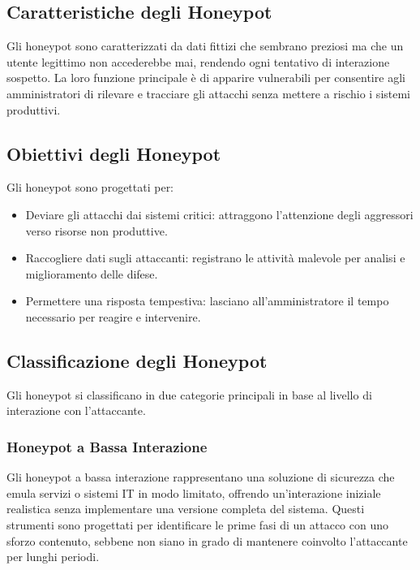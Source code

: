 \subsection{Caratteristiche degli Honeypot}

Gli honeypot sono caratterizzati da dati fittizi che sembrano preziosi ma che un utente legittimo non accederebbe mai, rendendo ogni tentativo di interazione sospetto. La loro funzione principale è di apparire vulnerabili per consentire agli amministratori di rilevare e tracciare gli attacchi senza mettere a rischio i sistemi produttivi.

\subsection{Obiettivi degli Honeypot}

Gli honeypot sono progettati per:

\begin{itemize}
    \item Deviare gli attacchi dai sistemi critici: attraggono l'attenzione degli aggressori verso risorse non produttive.
    \item Raccogliere dati sugli attaccanti: registrano le attività malevole per analisi e miglioramento delle difese.
    \item Permettere una risposta tempestiva: lasciano all'amministratore il tempo necessario per reagire e intervenire.
\end{itemize}

\subsection{Classificazione degli Honeypot}

Gli honeypot si classificano in due categorie principali in base al livello di interazione con l'attaccante.

\subsubsection{Honeypot a Bassa Interazione}

Gli honeypot a bassa interazione rappresentano una soluzione di sicurezza che emula servizi o sistemi IT in modo limitato, offrendo un'interazione iniziale realistica senza implementare una versione completa del sistema. Questi strumenti sono progettati per identificare le prime fasi di un attacco con uno sforzo contenuto, sebbene non siano in grado di mantenere coinvolto l'attaccante per lunghi periodi.

